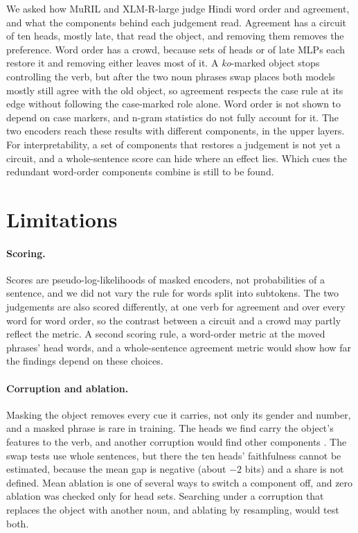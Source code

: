 \documentclass[11pt]{article}
\begin{document}
We asked how MuRIL and XLM-R-large judge Hindi word order and agreement, and what the components behind each judgement read.
Agreement has a circuit of ten heads, mostly late, that read the object, and removing them removes the preference.
Word order has a crowd, because sets of heads or of late MLPs each restore it and removing either leaves most of it.
A \emph{ko}-marked object stops controlling the verb, but after the two noun phrases swap places both models mostly still agree with the old object, so agreement respects the case rule at its edge without following the case-marked role alone.
Word order is not shown to depend on case markers, and n-gram statistics do not fully account for it.
The two encoders reach these results with different components, in the upper layers.
For interpretability, a set of components that restores a judgement is not yet a circuit, and a whole-sentence score can hide where an effect lies.
Which cues the redundant word-order components combine is still to be found.

\section*{Limitations}

\paragraph{Scoring.}
Scores are pseudo-log-likelihoods of masked encoders, not probabilities of a sentence, and we did not vary the rule for words split into subtokens.
The two judgements are also scored differently, at one verb for agreement and over every word for word order, so the contrast between a circuit and a crowd may partly reflect the metric.
A second scoring rule, a word-order metric at the moved phrases' head words, and a whole-sentence agreement metric would show how far the findings depend on these choices.

\paragraph{Corruption and ablation.}
Masking the object removes every cue it carries, not only its gender and number, and a masked phrase is rare in training.
The heads we find carry the object's features to the verb, and another corruption would find other components \citep{zhang2024}.
The swap tests use whole sentences, but there the ten heads' faithfulness cannot be estimated, because the mean gap is negative (about $-2$ bits) and a share is not defined.
Mean ablation is one of several ways to switch a component off, and zero ablation was checked only for head sets.
Searching under a corruption that replaces the object with another noun, and ablating by resampling, would test both.
\end{document}

